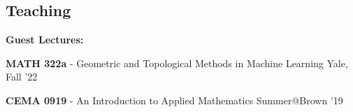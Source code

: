 \documentclass[margin,line]{res}
\newenvironment{list1}{
  \begin{list}{\ding{113}}{
      \setlength{\itemsep}{0in}
      \setlength{\parsep}{0in} \setlength{\parskip}{0in}
      \setlength{\topsep}{0in} \setlength{\partopsep}{0in}
      \setlength{\leftmargin}{0.17in}}}{\end{list}}
\begin{document}
\begin{resume}

\section{\sc Teaching}

\textbf{Guest Lectures:}
\vspace*{.2cm}

\begin{list1}
\setlength\itemsep{0.25em}
\item[] {\bf MATH 322a} - Geometric and Topological Methods in Machine Learning \hfill Yale, Fall '22
\item[] {\bf CEMA 0919} - An Introduction to Applied Mathematics \hfill Summer@Brown '19
\end{list1} 


\end{resume}
\end{document}
